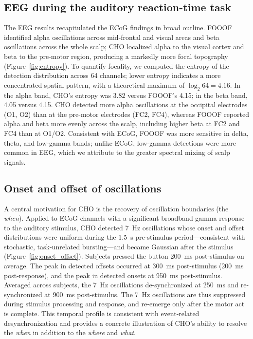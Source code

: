 \documentclass[11pt]{article}
\begin{document}
\subsection{EEG during the auditory reaction-time task}

The EEG results recapitulated the ECoG findings in broad outline. FOOOF identified alpha oscillations across mid-frontal and visual areas and beta oscillations across the whole scalp; CHO localized alpha to the visual cortex and beta to the pre-motor region, producing a markedly more focal topography (Figure~\ref{fig:entropy}). To quantify focality, we computed the entropy of the detection distribution across 64 channels; lower entropy indicates a more concentrated spatial pattern, with a theoretical maximum of $\log_2 64 = 4.16$. In the alpha band, CHO's entropy was 3.82 versus FOOOF's 4.15; in the beta band, 4.05 versus 4.15. CHO detected more alpha oscillations at the occipital electrodes (O1, O2) than at the pre-motor electrodes (FC2, FC4), whereas FOOOF reported alpha and beta more evenly across the scalp, including higher beta at FC2 and FC4 than at O1/O2. Consistent with ECoG, FOOOF was more sensitive in delta, theta, and low-gamma bands; unlike ECoG, low-gamma detections were more common in EEG, which we attribute to the greater spectral mixing of scalp signals.

\subsection{Onset and offset of oscillations}

A central motivation for CHO is the recovery of oscillation boundaries (the \emph{when}). Applied to ECoG channels with a significant broadband gamma response to the auditory stimulus, CHO detected 7~Hz oscillations whose onset and offset distributions were uniform during the 1.5~s pre-stimulus period---consistent with stochastic, task-unrelated bursting---and became Gaussian after the stimulus (Figure~\ref{fig:onset_offset}). Subjects pressed the button 200~ms post-stimulus on average. The peak in detected offsets occurred at 300~ms post-stimulus (200~ms post-response), and the peak in detected onsets at 950~ms post-stimulus. Averaged across subjects, the 7~Hz oscillations de-synchronized at 250~ms and re-synchronized at 900~ms post-stimulus. The 7~Hz oscillations are thus suppressed during stimulus processing and response, and re-emerge only after the motor act is complete. This temporal profile is consistent with event-related desynchronization \citep{pfurtscheller1999eventrelated} and provides a concrete illustration of CHO's ability to resolve the \emph{when} in addition to the \emph{where} and \emph{what}.
\end{document}
